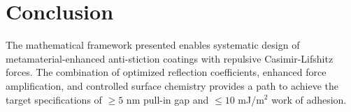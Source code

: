 \documentclass{article}
\begin{document}
\section{Conclusion}

The mathematical framework presented enables systematic design of metamaterial-enhanced anti-stiction coatings with repulsive Casimir-Lifshitz forces. The combination of optimized reflection coefficients, enhanced force amplification, and controlled surface chemistry provides a path to achieve the target specifications of $\geq 5$ nm pull-in gap and $\leq 10$ mJ/m$^2$ work of adhesion.
\end{document}
